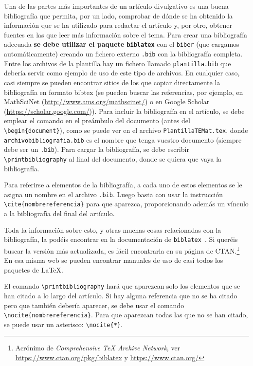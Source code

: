 \documentclass[bibtex]{TEMat-article}
\begin{document}
Una de las partes más importantes de un artículo divulgativo es una buena bibliografía que permita, por un lado, comprobar de dónde se ha obtenido la información que se ha utilizado para redactar el artículo y, por otro, obtener fuentes en las que leer más información sobre el tema.
Para crear una bibliografía adecuada \textbf{se debe utilizar el paquete \texttt{biblatex}} con el  \verb+biber+ (que cargamos automáticamente) creando un fichero externo \verb+.bib+ con la bibliografía completa.
Entre los archivos de la plantilla hay un fichero llamado \verb+plantilla.bib+ que debería servir como ejemplo de uso de este tipo de archivos.
En cualquier caso, casi siempre se pueden encontrar sitios de los que copiar directamente la bibliografía en formato bibtex (se pueden buscar las referencias, por ejemplo, en MathSciNet (\url{http://www.ams.org/mathscinet/}) o en Google Scholar (\url{https://scholar.google.com/})).
Para incluir la bibliografía en el artículo, se debe emplear el comando \verb++ en el preámbulo del documento (antes del \verb+\begin{document}+), como se puede ver en el archivo \verb+PlantillaTEMat.tex+, donde \verb+archivobibliografia.bib+ es el nombre que tenga vuestro documento (siempre debe ser un \verb+.bib+).
Para cargar la bibliografía, se debe escribir \verb+\printbibliography+ al final del documento, donde se quiera que vaya la bibliografía.

Para referirse a elementos de la bibliografía, a cada uno de estos elementos se le asigna un nombre en el archivo \verb+.bib+.
Luego basta con usar la instrucción \verb+\cite{nombrereferencia}+ para que aparezca, proporcionando además un vínculo a la bibliografía del final del artículo.

Toda la información sobre esto, y otras muchas cosas relacionadas con la bibliografía, la podéis encontrar en la documentación de \verb+biblatex+~\cite{biblatex}.
Si queréis buscar la versión más actualizada, es fácil encontrarla en su página de CTAN.\footnote{Acrónimo de \emph{Comprehensive \protect\TeX{} Archive Network}, ver \url{https://www.ctan.org/pkg/biblatex} y \url{https://www.ctan.org/}}
En esa misma web se pueden encontrar manuales de uso de casi todos los paquetes de \LaTeX.

\begin{nota}
El comando \verb+\printbibliography+ hará que aparezcan solo los elementos que se han citado a lo largo del artículo.
Si hay alguna referencia que no se ha citado pero que también debería aparecer, se debe usar el comando \verb+\nocite{nombrereferencia}+.
Para que aparezcan todas las que no se han citado, se puede usar un asterisco: \verb+\nocite{*}+.
\end{nota}
\end{document}
